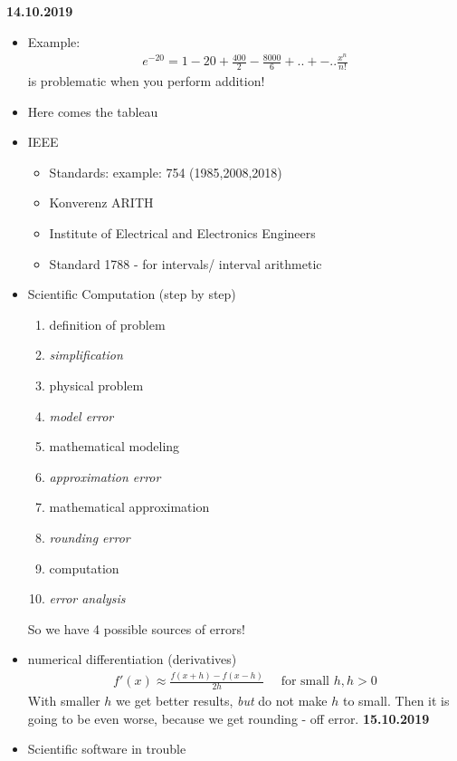 \textbf{14.10.2019}
\begin{itemize}
	\item Example:
	\begin{align*}
		e^{-20}=1-20+\frac{400}{2}-\frac{8000}{6}+..+-.. \frac{x^n}{n!}
	\end{align*}
	is problematic when you perform addition!
	\item Here comes the tableau
	\item IEEE 
	\begin{itemize}
		\item Standards: example: 754 (1985,2008,2018)
		\item Konverenz ARITH
		\item Institute of Electrical and Electronics Engineers
		\item Standard 1788 - for intervals/ interval arithmetic
	\end{itemize}
	\item Scientific Computation (step by step) %
	\begin{enumerate}
		\item definition of problem
		\item \emph{simplification}
		\item physical problem
		\item \emph{model error}
		\item mathematical modeling
		\item \emph{approximation error}
		\item mathematical approximation
		\item \emph{rounding error}
		\item computation
		\item \emph{error analysis}
	\end{enumerate}
	So we have 4 possible sources of errors!
	\item numerical differentiation (derivatives)
	\begin{align*}
		f'(x)\approx \frac{f(x+h)-f(x-h)}{2h} \quad \text{ for small $h$}, h > 0
	\end{align*}
	With smaller $h$ we get better results, \emph{but} do not make $h$ to small. Then it is going to be even worse, because we get rounding - off error.
	\bigskip
	\textbf{15.10.2019}\\
	\item Scientific software in trouble\\
	\begin{tabularx}{\textwidth}{|X|X|X|}

\end{tabularx}
\end{itemize}
